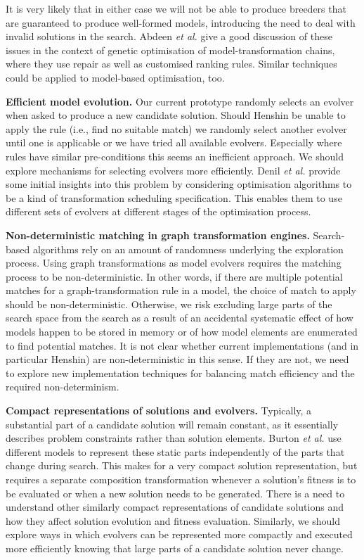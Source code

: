 			It is very likely that in either case we will not be able to produce breeders that are guaranteed to produce well-formed models, introducing the need to
			deal with invalid solutions in the search. Abdeen \emph{et al.} \cite{Abdeen+14} give a good discussion of these issues in the context of genetic
			optimisation of model-transformation chains, where they use repair as well as customised ranking rules. Similar techniques could be applied to model-based
			optimisation, too.
			
		\textbf{Efficient model evolution.} 
			Our current prototype randomly selects an evolver when asked to produce a new candidate solution. Should Henshin be unable to apply the rule (i.e., find no
			suitable match) we randomly select another evolver until one is applicable or we have tried all available evolvers. Especially where rules have similar 
			pre-conditions this seems an inefficient approach. We should explore mechanisms for selecting evolvers more efficiently. Denil \emph{et al.} \cite{Denil+14}
			provide some initial insights into this problem by considering optimisation algorithms to be a kind of transformation scheduling specification. This enables
			them to use different sets of evolvers at different stages of the optimisation process.
			
		\textbf{Non-deterministic matching in graph transformation engines.} 
			Search-based algorithms rely on an amount of randomness underlying the exploration process. Using graph transformations as model evolvers requires the
			matching process to be non-deterministic. In other words, if there are multiple potential matches for a graph-transformation rule in a model, the choice of
			match to apply should be non-deterministic. Otherwise, we risk excluding large parts of the search space from the search as a result of an accidental
			systematic effect of how models happen to be stored in memory or of how model elements are enumerated to find potential matches. It is not clear whether
			current implementations (and in particular Henshin) are non-deterministic in this sense. If they are not, we need to explore new implementation techniques
			for balancing match efficiency and the required non-determinism.
			
		\textbf{Compact representations of solutions and evolvers.} 
			Typically, a substantial part of a candidate solution will remain constant, as it essentially describes problem constraints rather than solution elements.
			Burton \emph{et al.} \cite{Burton+12} use different models to represent these static parts independently of the parts that change during search. This makes
			for a very compact solution representation, but requires a separate composition transformation whenever a solution's fitness is to be evaluated or when a
			new solution needs to be generated. There is a need to understand other similarly compact representations of candidate solutions and how they affect
			solution evolution and fitness evaluation. Similarly, we should explore ways in which evolvers can be represented more compactly and executed more
			efficiently knowing that large parts of a candidate solution never change.
		
